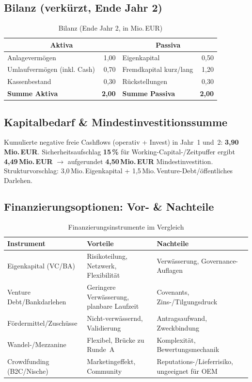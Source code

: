 \documentclass[
%
ngerman %
%
numeric %
]{wbh-assignment}
\begin{document}
\subsection{Bilanz (verkürzt, Ende Jahr 2)}
\begin{table}[htb!]
\centering
\caption{Bilanz (Ende Jahr 2, in Mio.\,EUR)}
\begin{tabular}{l r l r}
\multicolumn{2}{c}{\textbf{Aktiva}} & \multicolumn{2}{c}{\textbf{Passiva}} \\
\hline
Anlagevermögen & 1{,}00 & Eigenkapital & 0{,}50 \\
Umlaufvermögen (inkl. Cash) & 0{,}70 & Fremdkapital kurz/lang & 1{,}20 \\
Kassenbestand & 0{,}30 & Rückstellungen & 0{,}30 \\
\textbf{Summe Aktiva} & \textbf{2{,}00} & \textbf{Summe Passiva} & \textbf{2{,}00} \\
\end{tabular}
\end{table}

\subsection{Kapitalbedarf \& Mindestinvestitionssumme}
Kumulierte negative freie Cashflows (operativ + Invest) in Jahr~1 und~2: \textbf{3{,}90\,Mio.\,EUR}. Sicherheitsaufschlag \textbf{15\,\%} für Working-Capital-/Zeitpuffer ergibt \textbf{4{,}49\,Mio.\,EUR} $\rightarrow$ aufgerundet \textbf{4{,}50\,Mio.\,EUR} Mindestinvestition. Strukturvorschlag: 3{,}0\,Mio.\,Eigenkapital + 1{,}5\,Mio.\,Venture-Debt/öffentliches Darlehen.

\subsection{Finanzierungsoptionen: Vor- \& Nachteile}
\begin{table}[htb!]
\centering
\caption{Finanzierungsinstrumente im Vergleich}
\begin{tabular}{l l l}
\textbf{Instrument} & \textbf{Vorteile} & \textbf{Nachteile} \\
\hline
Eigenkapital (VC/BA) & Risikoteilung, Netzwerk, Flexibilität & Verwässerung, Governance-Auflagen \\
Venture Debt/Bankdarlehen & Geringere Verwässerung, planbare Laufzeit & Covenants, Zins-/Tilgungsdruck \\
Fördermittel/Zuschüsse & Nicht-verwässernd, Validierung & Antragsaufwand, Zweckbindung \\
Wandel-/Mezzanine & Flexibel, Brücke zu Runde~A & Komplexität, Bewertungsmechanik \\
Crowdfunding (B2C/Nische) & Marketingeffekt, Community & Reputations-/Lieferrisiko, ungeeignet für OEM \\
\end{tabular}
\end{table}
\end{document}
